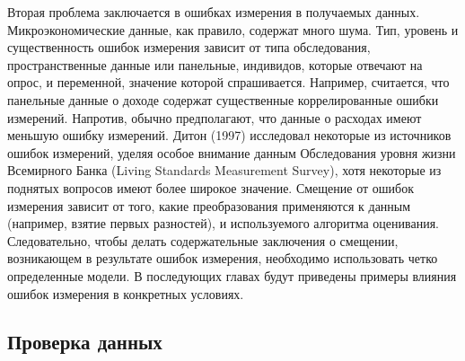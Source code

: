 Вторая проблема заключается в ошибках измерения в получаемых данных. Микроэкономические данные, как правило, содержат много шума. Тип, уровень и существенность ошибок измерения зависит от типа обследования, пространственные данные или панельные, индивидов, которые отвечают на опрос, и переменной, значение которой спрашивается. Например, считается, что панельные данные о доходе содержат существенные коррелированные ошибки измерений. Напротив, обычно предполагают, что данные о расходах имеют меньшую ошибку измерений.
Дитон (1997) исследовал некоторые из источников ошибок измерений, уделяя особое внимание данным Обследования уровня жизни Всемирного Банка (Living Standards Measurement Survey), хотя некоторые из поднятых вопросов имеют более широкое значение. Смещение от ошибок измерения зависит от того, какие преобразования применяются к данным (например, взятие первых разностей), и используемого алгоритма оценивания. Следовательно, чтобы делать содержательные заключения о  смещении, возникающем в результате ошибок измерения, необходимо использовать четко определенные модели. В последующих главах будут приведены примеры влияния ошибок измерения в конкретных условиях.



\subsection{Проверка данных}

